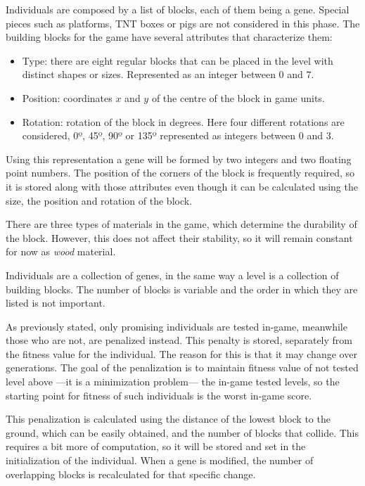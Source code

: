 Individuals are composed by a list of blocks, each of them being a gene. Special pieces such as platforms, TNT boxes or pigs are not considered in this phase. The building blocks for the game have several attributes that characterize them: 

\begin{itemize}
	\item Type: there are eight regular blocks that can be placed in the level with distinct shapes or sizes. Represented as an integer between $0$ and $7$.
	\item Position: coordinates $x$ and $y$ of the centre of the block in game units.
	\item Rotation: rotation of the block in degrees. Here four different rotations are considered, 0º, 45º, 90º or 135º represented as integers between $0$ and $3$.
\end{itemize}

Using this representation a gene will be formed by two integers and two floating point numbers.
The position of the corners of the block is frequently required, so it is stored along with those attributes even though it can be calculated using the size, the position and rotation of the block. 

There are three types of materials in the game, which determine the durability of the block. However, this does not affect their stability, so it will remain constant for now as \textit{wood} material.

Individuals are a collection of genes, in the same way a level is a collection of building blocks. The number of blocks is variable and the order in which they are listed is not important. 

As previously stated, only promising individuals are tested in-game, meanwhile those who are not, are penalized instead. This penalty is stored, separately from the fitness value for the individual. The reason for this is that it may change over generations. The goal of the penalization is to maintain fitness value of not tested level above ---it is a minimization problem--- the in-game tested levels, so the starting point for fitness of such individuals is the worst in-game score.

This penalization is calculated using the distance of the lowest block to the ground, which can be easily obtained, and the number of blocks that collide. This requires a bit more of computation, so it will be stored and set in the initialization of the individual. When a gene is modified, the number of overlapping blocks is recalculated for that specific change.

